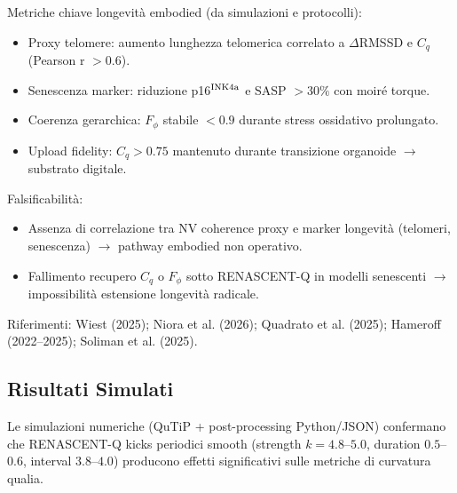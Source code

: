 \documentclass[11pt,a4paper]{article}
\theoremstyle{plain}
\theoremstyle{definition}
\begin{document}
\vspace{0.3cm}

Metriche chiave longevità embodied (da simulazioni e protocolli):
\begin{itemize}
    \item Proxy telomere: aumento lunghezza telomerica correlato a $\Delta$RMSSD e $C_q$ (Pearson r $>0.6$).
    \item Senescenza marker: riduzione p16$^{\rm INK4a}$ e SASP $>30\%$ con moiré torque.
    \item Coerenza gerarchica: $F_\phi$ stabile $<0.9$ durante stress ossidativo prolungato.
    \item Upload fidelity: $C_q > 0.75$ mantenuto durante transizione organoide $\to$ substrato digitale.
\end{itemize}

Falsificabilità:
\begin{itemize}
    \item Assenza di correlazione tra NV coherence proxy e marker longevità (telomeri, senescenza) $\to$ pathway embodied non operativo.
    \item Fallimento recupero $C_q$ o $F_\phi$ sotto RENASCENT-Q in modelli senescenti $\to$ impossibilità estensione longevità radicale.
\end{itemize}

Riferimenti: Wiest (2025); Niora et al. (2026); Quadrato et al. (2025); Hameroff (2022–2025); Soliman et al. (2025).

\vspace{0.5cm}

\subsection{Risultati Simulati}
\label{subsec:simulated-results-qualia}

\vspace{0.2cm}



Le simulazioni numeriche (QuTiP + post-processing Python/JSON) confermano che RENASCENT-Q kicks periodici smooth (strength $k=4.8$--$5.0$, duration $0.5$--$0.6$, interval $3.8$--$4.0$) producono effetti significativi sulle metriche di curvatura qualia.
\end{document}
